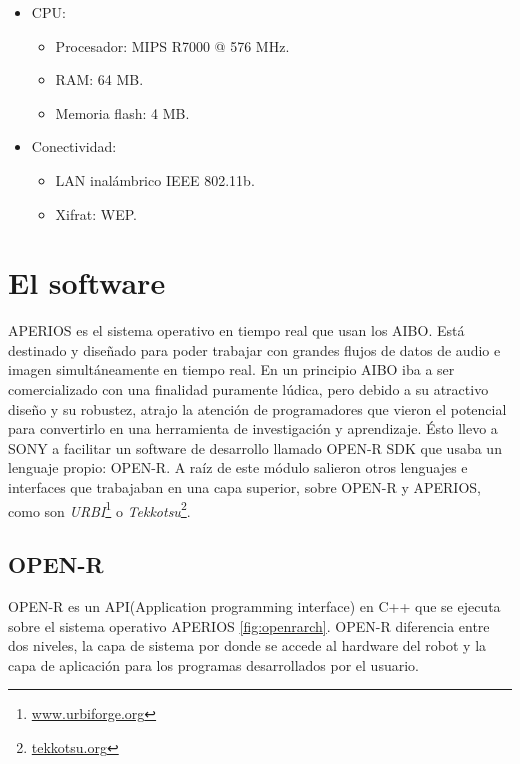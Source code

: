 \documentclass[12pt,a4paper,final,twoside]{book}
\begin{document}
\begin{multicols}{2}
\begin{itemize}
\begin{itemize}
\item Altura: 278 mm.
\item Largo: 319 mm.
\item Ancho: 180 mm.
\item Peso con batería: 1.65 kg. 
\end{itemize}
\item CPU:
\begin{itemize}
\item Procesador: MIPS R7000 @ 576 MHz.
\item RAM: 64 MB.
\item Memoria flash: 4 MB.
\end{itemize}
\end{itemize}
\begin{itemize}
\item Conectividad:
\begin{itemize}
\item LAN inalámbrico IEEE 802.11b.
\item Xifrat: WEP.
\end{itemize}
\end{itemize}
\end{multicols}

\section{El software} \label{softwares}
APERIOS es el sistema operativo en tiempo real que usan los AIBO. Está destinado y diseñado para poder trabajar con grandes flujos de datos de audio e imagen simultáneamente en tiempo real.
En un principio AIBO iba a ser comercializado con una finalidad puramente lúdica, pero debido a su atractivo diseño y su robustez, atrajo la atención de programadores que vieron el potencial para convertirlo en una herramienta de investigación y aprendizaje. Ésto llevo a SONY a facilitar un software de desarrollo llamado OPEN-R SDK que usaba un lenguaje propio: OPEN-R. A raíz de este módulo salieron otros lenguajes e interfaces que trabajaban en una capa superior, sobre OPEN-R y APERIOS, como son \textit{URBI}\footnote{\url{www.urbiforge.org}} o \textit{Tekkotsu}\footnote{\url{tekkotsu.org}}.

\subsection{OPEN-R}
OPEN-R es un API(Application programming interface) en C++ que se ejecuta sobre el sistema operativo APERIOS \ref{fig:openrarch}. OPEN-R diferencia entre dos niveles, la capa de sistema por donde se accede al hardware del robot y la capa de aplicación para los programas desarrollados por el usuario.
\end{document}

